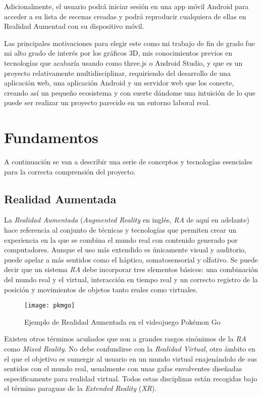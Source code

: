 Adicionalmente, el usuario podrá iniciar sesión en una app móvil Android para acceder a su lista de escenas creadas y podrá reproducir cualquiera de ellas en Realidad Aumentad con su dispositivo móvil.

Las principales motivaciones para elegir este como mi trabajo de fin de grado fue mi alto grado de interés por los gráficos 3D, mis conocimientos previos en tecnologías que acabaría usando como three.js o Android Studio, y que es un proyecto relativamente multidisciplinar, requiriendo del desarrollo de una aplicación web, una aplicación Android y un servidor web que los conecte, creando así un pequeño ecosistema y con suerte dándome una intuición de lo que puede ser realizar un proyecto parecido en un entorno laboral real.

\section{Fundamentos}

A continuación se van a describir una serie de conceptos y tecnologías esenciales para la correcta comprensión del proyecto.

\subsection{Realidad Aumentada}

La \textit{Realidad Aumentada} (\textit{Augmented Reality} en inglés, \textit{RA} de aquí en adelante) hace referencia al conjunto de técnicas y tecnologías que permiten crear un experiencia en la que se combina el mundo real con contenido generado por computadores. Aunque el uso más extendido es únicamente visual y auditorio, puede apelar a más sentidos como el háptico, somatosensorial y olfativo. Se puede decir que un sistema \textit{RA} debe incorporar tres elementos básicos: una combinación del mundo real y el virtual, interacción en tiempo real y un correcto registro de la posición y movimientos de objetos tanto reales como virtuales. 

\begin{figure}[H]
    \centering
    \texttt{[image: pkmgo]}
    \caption[Ejemplo RA]{Ejemplo de Realidad Aumentada en el videojuego Pokémon Go}
\end{figure}

Existen otros términos acuñados que son a grandes rasgos sinónimos de la \textit{RA} como \textit{Mixed Reality}. No debe confundirse con la \textit{Realidad Virtual}, otro ámbito en el que el objetivo es sumergir al usuario en un mundo virtual enajenándolo de sus sentidos con el mundo real, usualmente con unas gafas envolventes diseñadas especificamente para realidad virtual. Todos estas disciplinas están recogidas bajo el término paraguas de la \textit{Extended Reality} (\textit{XR}).

